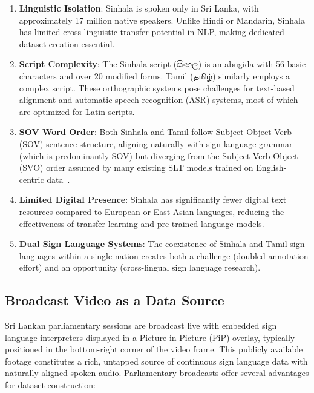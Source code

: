 \documentclass[journal]{IEEEtran}
\begin{document}
\begin{enumerate}
    \item \textbf{Linguistic Isolation}: Sinhala is spoken only in Sri Lanka, with approximately 17 million native speakers. Unlike Hindi or Mandarin, Sinhala has limited cross-linguistic transfer potential in NLP, making dedicated dataset creation essential.
    
    \item \textbf{Script Complexity}: The Sinhala script (සිංහල) is an abugida with 56 basic characters and over 20 modified forms. Tamil (தமிழ்) similarly employs a complex script. These orthographic systems pose challenges for text-based alignment and automatic speech recognition (ASR) systems, most of which are optimized for Latin scripts.
    
    \item \textbf{SOV Word Order}: Both Sinhala and Tamil follow Subject-Object-Verb (SOV) sentence structure, aligning naturally with sign language grammar (which is predominantly SOV) but diverging from the Subject-Verb-Object (SVO) order assumed by many existing SLT models trained on English-centric data~\cite{pfau2012sign}.
    
    \item \textbf{Limited Digital Presence}: Sinhala has significantly fewer digital text resources compared to European or East Asian languages, reducing the effectiveness of transfer learning and pre-trained language models.
    
    \item \textbf{Dual Sign Language Systems}: The coexistence of Sinhala and Tamil sign languages within a single nation creates both a challenge (doubled annotation effort) and an opportunity (cross-lingual sign language research).
\end{enumerate}

\subsection{Broadcast Video as a Data Source}

Sri Lankan parliamentary sessions are broadcast live with embedded sign language interpreters displayed in a Picture-in-Picture (PiP) overlay, typically positioned in the bottom-right corner of the video frame. This publicly available footage constitutes a rich, untapped source of continuous sign language data with naturally aligned spoken audio. Parliamentary broadcasts offer several advantages for dataset construction:
\end{document}

